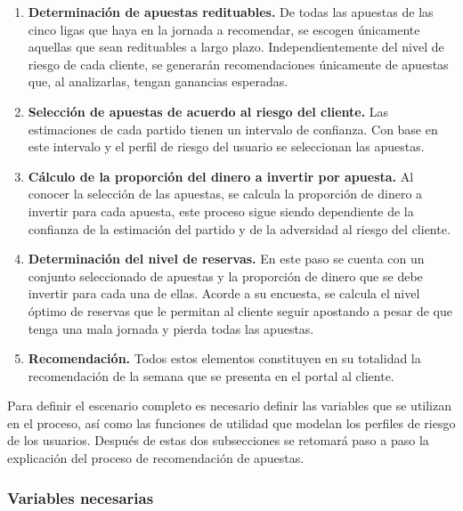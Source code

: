  \begin{enumerate}
 	\item \textbf{Determinación de apuestas redituables.} De todas las apuestas de las cinco ligas que haya en la jornada a recomendar, se escogen únicamente aquellas que sean redituables a largo plazo. Independientemente del nivel de riesgo de cada cliente, se generarán recomendaciones únicamente de apuestas que, al analizarlas, tengan ganancias esperadas.
 	\item \textbf{Selección de apuestas de acuerdo al riesgo del cliente.} Las estimaciones de cada partido tienen un intervalo de confianza. Con base en este intervalo y el perfil de riesgo del usuario se seleccionan las apuestas.
 	\item \textbf{Cálculo de la proporción del dinero a invertir por apuesta.} Al conocer la selección de las apuestas, se calcula la proporción de dinero a invertir para cada apuesta, este proceso sigue siendo dependiente de la confianza de la estimación del partido y de la adversidad al riesgo del cliente.
 	\item \textbf{Determinación del nivel de reservas.} En este paso se cuenta con un conjunto seleccionado de apuestas y la proporción de dinero que se debe invertir para cada una de ellas. Acorde a su encuesta, se calcula el nivel óptimo de reservas que le permitan al cliente seguir apostando a pesar de que tenga una mala jornada y pierda todas las apuestas.
 	\item \textbf{Recomendación.} Todos estos elementos constituyen en su totalidad la recomendación de la semana que se presenta en el portal al cliente.
 \end{enumerate}
 
Para definir el escenario completo es necesario definir las variables que se utilizan en el proceso, así como las funciones de utilidad que modelan los perfiles de riesgo de los usuarios. Después de estas dos subsecciones se retomará paso a paso la explicación del proceso de recomendación de apuestas.
 
\subsubsection{Variables necesarias}

